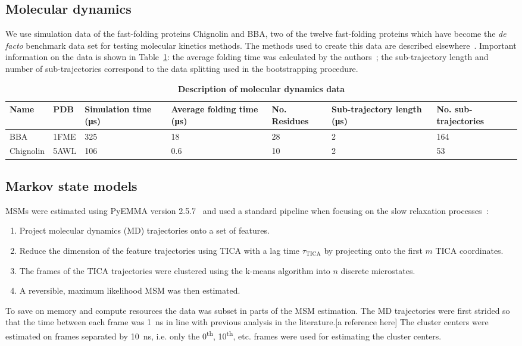 \documentclass[journal=jacsat,manuscript=article]{achemso}
\begin{document}
\subsection{Molecular dynamics}

We use simulation data of the fast-folding proteins Chignolin and BBA, two of the twelve fast-folding proteins which have become the \textit{de facto} benchmark data set for testing molecular kinetics methods. The methods used to create this data are described elsewhere~\cite{lindorff-larsen_how_2011}. Important information on the data is shown in Table~\ref{tab:data_description}: the average folding time was calculated by the authors~\cite{lindorff-larsen_how_2011}; the sub-trajectory length and number of sub-trajectories correspond to the data splitting used in the bootstrapping procedure. 

\begin{table}
    \caption{\textbf{Description of molecular dynamics data}}
    \begin{tabularx}{\textwidth}{llXXXXX}
    \toprule
    Name & PDB & Simulation time (\si{\micro\second}) & Average folding time (\si{\micro\second}) & No. Residues & Sub-trajectory length (\si{\micro\second}) & No. sub-trajectories \\
    \midrule
    BBA                 & 1FME      & \num{325}     & \num{18}  & 28 & \num{2} & 164 \\
    Chignolin           & 5AWL    & \num{106}     & \num{0.6}  & 10 & 2 & 53 \\ 
    \bottomrule
    \end{tabularx}
    \label{tab:data_description}
\end{table}

\subsection{Markov state models}
MSMs were estimated using PyEMMA version 2.5.7~\cite{schererPyEMMASoftwarePackage2015a} and used a standard pipeline when focusing on the slow relaxation processes~\cite{noe_markov_2019, husic_markov_2018}: 
\begin{enumerate}
    \item Project molecular dynamics (MD) trajectories onto a set of features. 
    \item Reduce the dimension of the feature trajectories using TICA with a lag time $\tau_{\mathrm{TICA}}$ by projecting onto the first $m$ TICA coordinates. 
    \item The frames of the TICA trajectories were clustered using the k-means algorithm into $n$ discrete microstates. 
    \item A reversible, maximum likelihood MSM was then estimated. 
\end{enumerate}
To save on memory and compute resources the data was subset in parts of the MSM estimation. The MD trajectories were first strided so that the time between each frame was \SI{1}{\nano\second} in line with previous analysis in the literature.[a reference here] The cluster centers were estimated on frames separated by \SI{10} {\nano\second}, i.e. only the 0\textsuperscript{th}, 10\textsuperscript{th}, etc. frames were used for estimating the cluster centers. 
\end{document}
